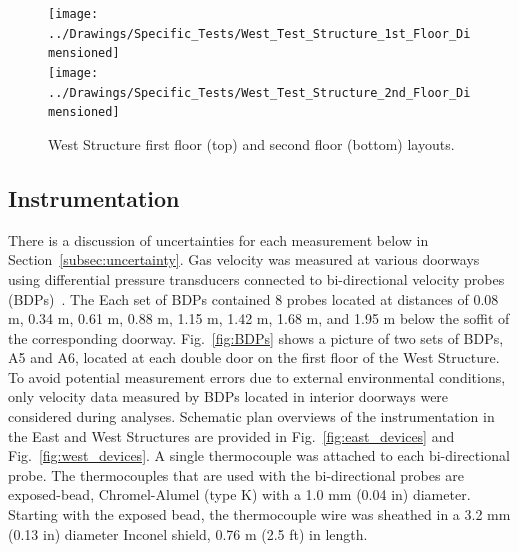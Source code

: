 \documentclass[12pt,oneside]{book}
\begin{document}
\clearpage

\begin{figure}[!ht]
\texttt{[image: ../Drawings/Specific\_Tests/West\_Test\_Structure\_1st\_Floor\_Dimensioned]}
\\
\texttt{[image: ../Drawings/Specific\_Tests/West\_Test\_Structure\_2nd\_Floor\_Dimensioned]}
\caption[West Structure First and Second Floor Layout]{West Structure first floor (top) and second floor (bottom) layouts.}
\label{fig:west_general_plan}
\end{figure}

\clearpage

\subsection{Instrumentation}
\label{subsec:instrumentation}
There is a discussion of uncertainties for each measurement below in Section~\ref{subsec:uncertainty}. Gas velocity was measured at various doorways using differential pressure transducers connected to bi-directional velocity probes (BDPs)~\cite{McCaffrey:Combustion_and_Flame}. The Each set of BDPs contained 8 probes located at distances of 0.08 m, 0.34 m, 0.61 m, 0.88 m, 1.15 m, 1.42 m, 1.68 m, and 1.95 m below the soffit of the corresponding doorway. Fig.~\ref{fig:BDPs} shows a picture of two sets of BDPs, A5 and A6, located at each double door on the first floor of the West Structure. To avoid potential measurement errors due to external environmental conditions, only velocity data measured by BDPs located in interior doorways were considered during analyses. Schematic plan overviews of the instrumentation in the East and West Structures are provided in Fig.~\ref{fig:east_devices} and Fig.~\ref{fig:west_devices}. A single thermocouple was attached to each bi-directional probe. The thermocouples that are used with the bi-directional probes are exposed-bead, Chromel-Alumel (type K) with a 1.0 mm (0.04 in) diameter. Starting with the exposed bead, the thermocouple wire was sheathed in a 3.2 mm (0.13 in) diameter Inconel shield, 0.76 m (2.5 ft) in length.
\end{document}
